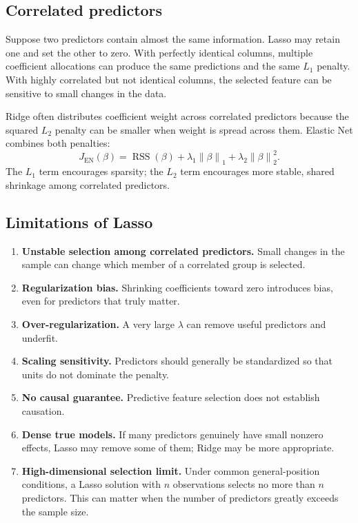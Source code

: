 \documentclass[11pt,a4paper]{article}
\numberwithin{equation}{section}
\newcommand{\norm}[1]{\left\lVert #1\right\rVert}
\newcommand{\RSS}{\operatorname{RSS}}
\begin{document}
\subsection{Correlated predictors}
Suppose two predictors contain almost the same information. Lasso may retain one and set the other to zero. With perfectly identical columns, multiple coefficient allocations can produce the same predictions and the same $L_1$ penalty. With highly correlated but not identical columns, the selected feature can be sensitive to small changes in the data.

Ridge often distributes coefficient weight across correlated predictors because the squared $L_2$ penalty can be smaller when weight is spread across them. Elastic Net combines both penalties:
\begin{equation}
  J_{\mathrm{EN}}(\beta)=\RSS(\beta)+\lambda_1\norm{\beta}_1+\lambda_2\norm{\beta}_2^2.
\end{equation}
The $L_1$ term encourages sparsity; the $L_2$ term encourages more stable, shared shrinkage among correlated predictors.

\subsection{Limitations of Lasso}
\begin{enumerate}
  \item \textbf{Unstable selection among correlated predictors.} Small changes in the sample can change which member of a correlated group is selected.
  \item \textbf{Regularization bias.} Shrinking coefficients toward zero introduces bias, even for predictors that truly matter.
  \item \textbf{Over-regularization.} A very large $\lambda$ can remove useful predictors and underfit.
  \item \textbf{Scaling sensitivity.} Predictors should generally be standardized so that units do not dominate the penalty.
  \item \textbf{No causal guarantee.} Predictive feature selection does not establish causation.
  \item \textbf{Dense true models.} If many predictors genuinely have small nonzero effects, Lasso may remove some of them; Ridge may be more appropriate.
  \item \textbf{High-dimensional selection limit.} Under common general-position conditions, a Lasso solution with $n$ observations selects no more than $n$ predictors. This can matter when the number of predictors greatly exceeds the sample size.
\end{enumerate}
\end{document}
